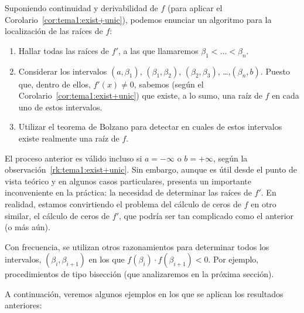 \begin{remark}
  \label{rk:tema1:separac-ceros}
  Suponiendo continuidad y derivabilidad de $f$ (para
  aplicar el Corolario~\ref{cor:tema1:exist+unic}), %
  podemos enunciar un algoritmo para la localización de las raíces de
  $f$:
  \begin{enumerate}
  \item Hallar todas las raíces de $f'$, a las que llamaremos
    $\beta_1<\dots<\beta_n$.
  \item Considerar los intervalos $(a,\beta_1)$, $(\beta_1,\beta_2)$,
    $(\beta_2,\beta_3)$, \dots,$(\beta_n,b)$. Puesto que, dentro de
    ellos, $f'(x)\neq 0$, sabemos (según el Corolario~\ref{cor:tema1:exist+unic})
    que existe, a lo sumo, una raíz de $f$ en cada uno de estos
    intervalos.
  \item Utilizar el teorema de Bolzano para detectar en cuales de
    estos intervalos existe realmente una raíz de $f$.
  \end{enumerate}
  El proceso anterior es válido incluso si $a=-\infty$ o $b=+\infty$,
  según la observación~\ref{rk:tema1:exist+unic}.  Sin embargo, aunque es
  útil desde el punto de vista teórico y en algunos casos
  particulares, presenta un importante inconveniente en la práctica:
  la necesidad de determinar las raíces de  $f'$.  En
  realidad, estamos convirtiendo el problema del cálculo de ceros de
  $f$ en otro similar, el cálculo de ceros de $f'$, que podría ser tan
  complicado como el anterior (o más aún).

  Con frecuencia, se utilizan otros razonamientos para determinar
  todos los intervalos, $(\beta_i,\beta_{i+1})$ en los que
  $f(\beta_i)\cdot f(\beta_{i+1})<0$. Por ejemplo, procedimientos de
  tipo bisección (que analizaremos en la próxima sección).
\end{remark}

A continuación, veremos algunos ejemplos en los que se aplican los
resultados anteriores:

